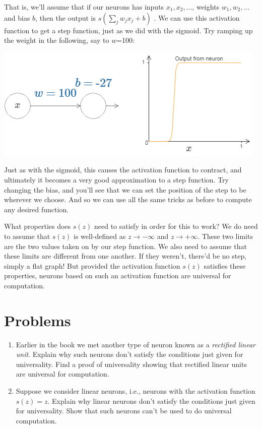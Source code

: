 That is, we'll assume that if our neurons has inputs $x_1,x_2,\ldots$, weights $w_1,w_2,\ldots$ and bias $b$, then the output is $s(\sum_j w_jx_j+b)$
.
We can use this activation function to get a step function, just as we did with the sigmoid. Try ramping up the weight in the following, say to $w$=100:

{\centering \includegraphics[width=.5\textwidth,]{pic/wigglyfn38} \par}


Just as with the sigmoid, this causes the activation function to contract, and ultimately it becomes a very good approximation to a step function. Try changing the bias, and you'll see that we can set the position of the step to be wherever we choose. And so we can use all the same tricks as before to compute any desired function.

What properties does $s(z)$ need to satisfy in order for this to work? We do need to assume that $s(z)$ is well-defined as $z\rightarrow-\infty$ and $z\rightarrow+\infty$. These two limits are the two values taken on by our step function. We also need to assume that these limits are different from one another. If they weren't, there'd be no step, simply a flat graph! But provided the activation function $s(z)$
satisfies these properties, neurons based on such an activation function are universal for computation.

\section*{Problems}
\begin{enumerate}
\item
Earlier in the book we met another type of neuron known as a \textit{rectified linear unit}. Explain why such neurons don't satisfy the conditions just given for universality. Find a proof of universality showing that rectified linear units are universal for computation.

\item
Suppose we consider linear neurons, i.e., neurons with the activation function $s(z)=z$. Explain why linear neurons don't satisfy the conditions just given for universality. Show that such neurons can't be used to do universal computation. 

\end{enumerate}

